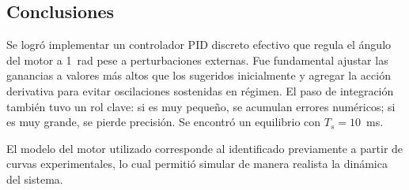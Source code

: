 \documentclass{article}
\begin{document}
\subsection*{Conclusiones}

Se logró implementar un controlador PID discreto efectivo que regula el ángulo del motor a 1~rad pese a perturbaciones externas. Fue fundamental ajustar las ganancias a valores más altos que los sugeridos inicialmente y agregar la acción derivativa para evitar oscilaciones sostenidas en régimen. El paso de integración también tuvo un rol clave: si es muy pequeño, se acumulan errores numéricos; si es muy grande, se pierde precisión. Se encontró un equilibrio con $T_s = 10$~ms.

El modelo del motor utilizado corresponde al identificado previamente a partir de curvas experimentales, lo cual permitió simular de manera realista la dinámica del sistema.
\end{document}
